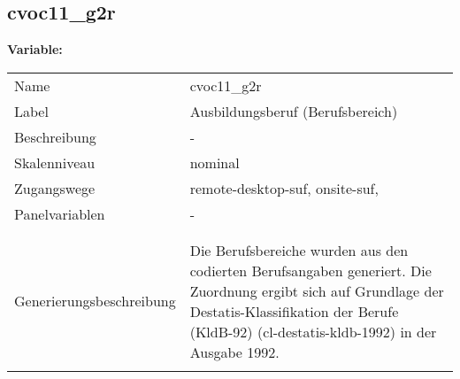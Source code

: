 	
	
	\subsection{cvoc11\_g2r}
	\label{subSection:cvoc11_g2r}

	\noindent\textbf{Variable:}\\
		\begin{tabular}{lL{11.3cm}}
			\label{tableVariable:cvoc11_g2r}
			Name & cvoc11\_g2r \\
			Label & Ausbildungsberuf (Berufsbereich) \\
			Beschreibung & - \\
			Skalenniveau & nominal \\
			Zugangswege &
				remote-desktop-suf,
				onsite-suf,
 \\
			Panelvariablen & -
			 \\
			 \\
 \\
					Generierungsbeschreibung & Die Berufsbereiche wurden aus den codierten Berufsangaben generiert. Die Zuordnung ergibt sich auf Grundlage der Destatis-Klassifikation der Berufe (KldB-92) (cl-destatis-kldb-1992) in der Ausgabe 1992. 
				 \\	
			 \\
		\end{tabular}






